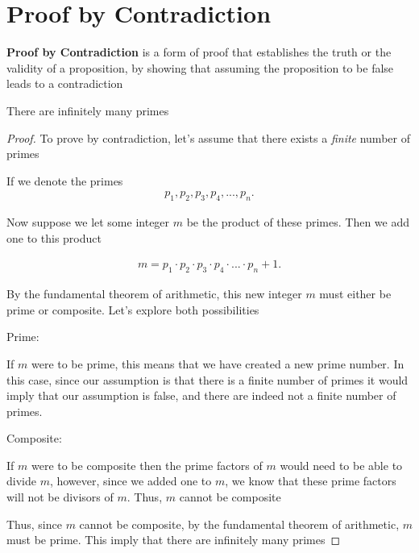 \documentclass{report}
\begin{document}
    \pagebreak \bigbreak \noindent 
    \section{\LARGE Proof by Contradiction} 
    \label{proofbycontradiction}
    \smallbreak \noindent
    \begin{definition}
        \textbf{Proof by Contradiction} is a form of proof that establishes the truth or the validity of a proposition, by showing that assuming the proposition to be false leads to a contradiction
    \end{definition}

    \bigbreak \noindent 
    \begin{remark}
       There are infinitely many primes
    \end{remark}
    \bigbreak \noindent 
    \begin{proof}
       To prove by contradiction, let's assume that there exists a \textit{finite} number of primes  
       \bigbreak \noindent 

       If we denote the primes 
       \begin{align*}
           p_{1}, p_{2}, p_{3},p_{4},...,p_{n}
       .\end{align*}
       \bigbreak \noindent 

       Now suppose we let some integer $m$ be the product of these primes. Then we add one to this product

       \begin{align*}
           m = p_{1} \cdot p_{2} \cdot p_{3} \cdot p_{4} \cdot ... \cdot p_{n} + 1
       .\end{align*}
       \bigbreak \noindent 

       By the fundamental theorem of arithmetic, this new integer $m$ must either be prime or composite. Let's explore both possibilities
       \bigbreak \noindent 

       Prime:
       \bigbreak \noindent 

       If $m$ were to be prime, this means that we have created a new prime number. In this case, since our assumption is that there is a finite number of primes it would imply that our assumption is false, and there are indeed not a finite number of primes.
       \bigbreak \noindent 

       Composite:
       \bigbreak \noindent 

       If $m $ were to be composite then the prime factors of $m $ would need to be able to divide $m$, however, since we added one to $m$, we know that these prime factors will not be divisors of $m$. Thus, $m$ cannot be composite 

       \bigbreak \noindent 

       Thus, since $m$ cannot be composite, by the fundamental theorem of arithmetic, $m$ must be prime. This imply that there are infinitely many primes
       \bigbreak \noindent 
       \ep
    \end{proof}
\end{document}
